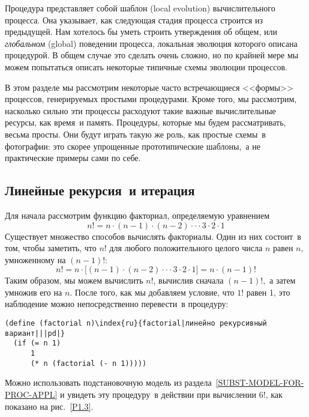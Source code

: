 %
Процедура представляет собой шаблон 
 (local evo\-lu\-tion) вычислительного процесса.  Она
указывает, как следующая стадия процесса строится из предыдущей.  Нам
хотелось бы уметь строить утверждения об общем, или {\em глобальном} 
(global) поведении процесса, локальная
эволюция которого описана процедурой. В общем случае это сделать
очень сложно, но по крайней мере мы можем попытаться описать некоторые 
типичные схемы эволюции процессов.

В этом разделе мы рассмотрим некоторые часто встречающиеся
<<формы>> процессов, генерируемых простыми процедурами.  Кроме того,
мы рассмотрим, насколько сильно эти процессы расходуют такие важные
вычислительные ресурсы, как время~и память. Процедуры, которые мы
будем рассматривать, весьма просты.  Они будут играть такую же роль,
как простые схемы~в фотографии:  это скорее упрощенные прототипические
шаблоны,~а не практические примеры сами по себе.

\subsection{Линейные рекурсия~и итерация}
\label{LINEAR-RECURSION-AND-ITERATION}


Для начала рассмотрим функцию
факториал,
определяемую уравнением 
$$
n! = n \cdot (n - 1) \cdot (n - 2) \cdot \cdot \cdot 3 \cdot 2 \cdot 1
$$
Существует множество способов вычислять факториалы. Один из них
состоит~в том, чтобы заметить, что $n!$ для любого
положительного целого числа $n$ равен
$n$, умноженному на $(n - 1)!$:
$$
n! = n \cdot \lbrack (n - 1) \cdot (n - 2) \cdot \cdot \cdot 3 \cdot 2
\cdot 1 \rbrack = n \cdot (n - 1)!
$$
Таким образом, мы можем вычислить $n!$, вычислив сначала
$(n - 1)!$,~а затем умножив его на $n$. После
того, как мы добавляем условие, что $1!$ равен 1, это
наблюдение можно непосредственно перевести~в процедуру:

\clearpage
\begin{Verbatim}[fontsize=\small]
(define (factorial n)\index{ru}{factorial|линейно рекурсивный вариант|||pd|}
  (if (= n 1)
      1
      (* n (factorial (- n 1)))))
\end{Verbatim}
Можно использовать подстановочную модель из раздела~\ref{SUBST-MODEL-FOR-PROC-APPL}
и увидеть эту процедуру~в действии при вычислении 6!, как показано на
рис.~\ref{P1.3}.


